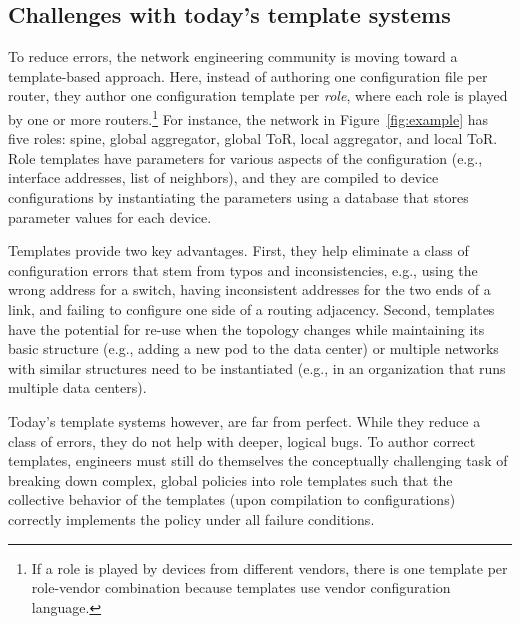 \documentclass{sig-alternate-10pt}
\begin{document}
\subsection{Challenges with today's template systems}

To reduce errors, the network engineering community is moving toward a template-based approach. Here, instead of authoring one configuration file per router, they author one configuration template per {\em role}, where each role is played by one or more routers.\footnote{If a role is played by devices from different vendors, there is one template per role-vendor combination because templates use vendor configuration language.} For instance, the network in Figure~\ref{fig:example} has five roles: spine, global aggregator, global ToR, local aggregator, and local ToR. Role templates have parameters for various aspects of the configuration (e.g., interface addresses, list of neighbors), and they are compiled to device configurations by instantiating the parameters using a database that stores parameter values for each device.

Templates provide two key advantages. First, they help eliminate a class of configuration errors that stem from typos and inconsistencies, e.g., using the wrong address for a switch, having inconsistent addresses for the two ends of a link, and failing to configure one side of a routing adjacency.  Second, templates have the potential for re-use when the topology changes while maintaining its basic structure (e.g., adding a new pod to the data center) or multiple networks with similar structures need to be instantiated (e.g., in an organization that runs multiple data centers).


Today's template systems however, are far from perfect. While they reduce a class of errors, they do not help with deeper, logical bugs.
To author correct templates, engineers must still do themselves the conceptually challenging task of breaking down complex, global policies into role templates such that the collective behavior of the templates (upon compilation to configurations) correctly implements the policy under all failure conditions.
\end{document}
